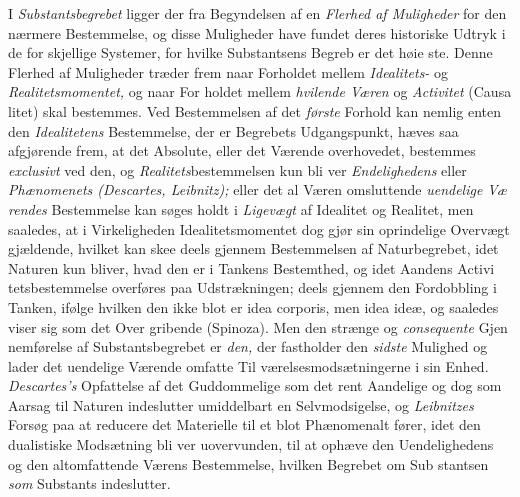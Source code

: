 I \emph{Substantsbegrebet} ligger der fra Begyndelsen af en
\emph{Flerhed af Muligheder} for den nærmere Bestemmelse, og
disse Muligheder have fundet deres historiske Udtryk i de for\-%
skjellige Systemer, for hvilke Substantsens Begreb er det høie\-%
ste. Denne Flerhed af Muligheder træder frem naar Forholdet
mellem \emph{Idealitets-} og \emph{Realitetsmomentet,} og naar For\-%
holdet mellem \emph{hvilende Væren} og \emph{Activitet} (Causa\-%
litet) skal bestemmes. Ved Bestemmelsen af det \emph{første}
Forhold kan nemlig enten den \emph{Idealitetens} Bestemmelse,
der er Begrebets Udgangspunkt, hæves saa afgjørende frem,
at det Absolute, eller det Værende overhovedet, bestemmes
\emph{exclusivt} ved den, og \emph{Realitets}bestemmelsen kun bli\-%
ver \emph{Endelighedens} eller \emph{Phænomenets (Descartes,
Leibnitz);} eller det al Væren omsluttende \emph{uendelige Væ\-%
rendes} Bestemmelse kan søges holdt i \emph{Ligevægt} af Idealitet og
Realitet, men saaledes, at i Virkeligheden Idealitetsmomentet dog
gjør sin oprindelige Overvægt gjældende, hvilket kan skee deels
gjennem Bestemmelsen af Naturbegrebet, idet Naturen kun bliver,
hvad den er i Tankens Bestemthed, og idet Aandens Activi\-%
tetsbestemmelse overføres paa Udstrækningen; deels gjennem
den Fordobbling i Tanken, ifølge hvilken den ikke blot er idea
corporis, men idea ideæ, og saaledes viser sig som det Over\-%
gribende (Spinoza). Men den strænge og \emph{consequente} Gjen\-%
nemførelse af Substantsbegrebet er \emph{den,} der fastholder den
\emph{sidste} Mulighed og lader det uendelige Værende omfatte Til\-%
værelsesmodsætningerne i sin Enhed. \emph{Descartes's} Opfattelse
af det Guddommelige som det rent Aandelige og dog som
Aarsag til Naturen indeslutter umiddelbart en Selvmodsigelse,
og \emph{Leibnitzes} Forsøg paa at reducere det Materielle til et
blot Phænomenalt fører, idet den dualistiske Modsætning bli\-%
ver uovervunden, til at ophæve den Uendelighedens og den
altomfattende Værens Bestemmelse, hvilken Begrebet om Sub\-%
stantsen \emph{som} Substants indeslutter.

